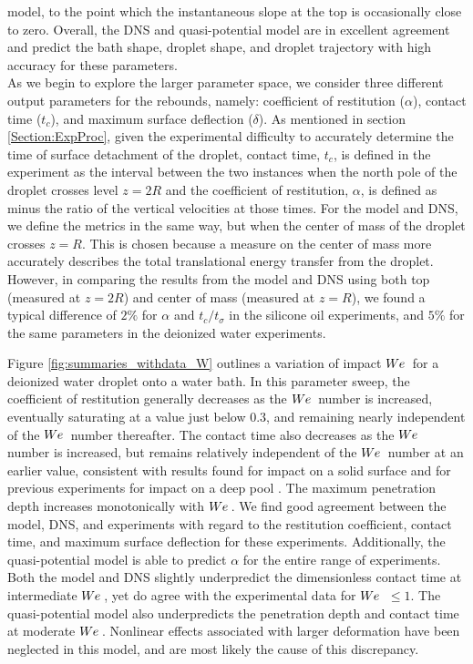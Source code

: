 \documentclass{jfm}
\begin{document}
model, to the point which the instantaneous slope at the top is occasionally close to zero. Overall, the DNS and quasi-potential model are in excellent agreement and predict the bath shape, droplet shape, and droplet trajectory with high accuracy for these parameters. \\
\hspace*{1em} As we begin to explore the larger parameter space, we consider three different output parameters for the rebounds, namely: coefficient of restitution ($\alpha$), contact time ($t_c$), and maximum surface deflection ($\delta$). As mentioned in section \ref{Section:ExpProc}, given the experimental difficulty to accurately determine the time of surface detachment of the droplet, contact time, $t_c$, is defined in the experiment as the interval between the two instances when the north pole of the droplet crosses level $z=2R$ and the coefficient of restitution, $\alpha$, is defined as minus the ratio of the vertical velocities at those times. For the model and DNS, we define the metrics in the same way, but when the center of mass of the droplet crosses $z=R$. This is chosen because a measure on the center of mass more accurately describes the total translational energy transfer from the droplet.  However, in comparing the results from the model and DNS using both top (measured at $z=2R$) and center of mass (measured at $z=R$), we found a typical difference of $2\%$ for $\alpha$ and $t_c/t_{\sigma}$ in the silicone oil experiments, and $5\%$ for the same parameters in the deionized water experiments. 

Figure \ref{fig:summaries_withdata_W} outlines a variation of impact $W\kern-0.03em e\,$ for a deionized water droplet onto a water bath. In this parameter sweep, the coefficient of restitution generally decreases as the $W\kern-0.03em e\,$ number is increased, eventually saturating at a value just below $0.3$, and remaining nearly independent of the $W\kern-0.03em e\,$ number thereafter. The contact time also decreases as the $W\kern-0.03em e\,$ number is increased, but remains relatively independent of the $W\kern-0.03em e\,$ number at an earlier value, consistent with results found for impact on a solid surface \citep{richard2002contact} and for previous experiments for impact on a deep pool \citep{zhao2011transition}. The maximum penetration depth increases monotonically with $W\kern-0.03em e\,$. We find good agreement between the model, DNS, and experiments with regard to the restitution coefficient, contact time, and maximum surface deflection for these experiments. Additionally, the quasi-potential model is able to predict $\alpha$ for the entire range of experiments. Both the model and DNS slightly underpredict the dimensionless contact time at intermediate $W\kern-0.03em e\,$, yet do agree with the experimental data for $W\kern-0.03em e\,$ $\leq 1$.  The quasi-potential model also underpredicts the penetration depth and contact time at moderate $W\kern-0.03em e\,$. Nonlinear effects associated with larger deformation have been neglected in this model, and are most likely the cause of this discrepancy.
\end{document}
